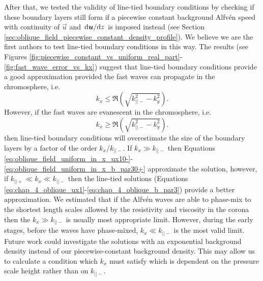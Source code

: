 After that, we tested the validity of line-tied boundary conditions by checking if these boundary layers still form if a piecewise constant background Alfv\'en speed with continuity of $\vec{u}$ and $\dv*{\boldsymbol{u}}{z}$ is imposed instead (see Section \ref{sec:oblique_field_piecewise_constant_density_profile}). We believe we are the first authors to test line-tied boundary conditions in this way. The results (see Figures \ref{fig:piecewise_constant_vs_uniform_real_part}-\ref{fig:fast_wave_error_vs_kx}) suggest that line-tied boundary conditions provide a good approximation provided the fast waves can propagate in the chromosphere, i.e.
\[k_x \le \Re(\sqrt{k_{||-}^2 - k_y^2}).\]
However, if the fast waves are evanescent in the chromosphere, i.e. 
\[k_x \ge \Re(\sqrt{k_{||-}^2 - k_y^2}).\]
then line-tied boundary conditions will overestimate the size of the boundary layers by a factor of the order $k_x / k_{||-}$. If $k_x\gg k_{||-}$ then Equations \eqref{eq:oblique_field_uniform_in_x_ux10-}-\eqref{eq:oblique_field_uniform_in_x_b_par30+} approximate the solution, however, if $k_{||+} \ll k_x\ll k_{||-}$ then the line-tied solutions (Equations \ref{eq:chap_4_oblique_ux1}-\ref{eq:chap_4_oblique_b_par3}) provide a better approximation. We estimated that if the Alfv\'en waves are able to phase-mix to the shortest length scales allowed by the resistivity and viscosity in the corona then the $k_x\gg k_{||-}$ is usually most appropriate limit. However, during the early stages, before the waves have phase-mixed, $k_x\ll k_{||-}$ is the most valid limit. Future work could investigate the solutions with an exponential background density instead of our piecewise-constant background density. This may allow us to calculate a condition which $k_x$ must satisfy which is dependent on the pressure scale height rather than on $k_{||-}$.


